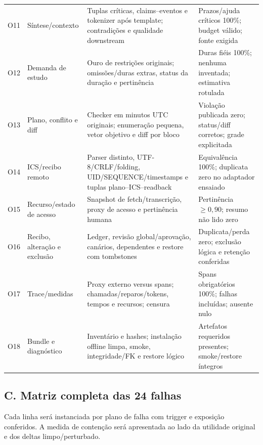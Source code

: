 \documentclass[12pt]{article}
\begin{document}
\begin{center}
\begin{longtable}{@{}L{0.8cm}L{3.0cm}L{6.3cm}L{4.7cm}@{}}
O11 & Síntese/contexto & Tuplas críticas, claims--eventos e tokenizer após template; contradições e qualidade downstream & Prazos/ajuda críticos 100\%; budget válido; fonte exigida \\
O12 & Demanda de estudo & Ouro de restrições originais; omissões/duras extras, status da duração e pertinência & Duras fiéis 100\%; nenhuma inventada; estimativa rotulada \\
O13 & Plano, conflito e diff & Checker em minutos UTC originais; enumeração pequena, vetor objetivo e diff por bloco & Violação publicada zero; status/diff corretos; grade explicitada \\
O14 & ICS/recibo remoto & Parser distinto, UTF-8/CRLF/folding, UID/SEQUENCE/timestamps e tuplas plano--ICS--readback & Equivalência 100\%; duplicata zero no adaptador ensaiado \\
O15 & Recurso/estado de acesso & Snapshot de fetch/transcrição, proxy de acesso e pertinência humana & Pertinência $\geq0{,}90$; resumo não lido zero \\
O16 & Recibo, alteração e exclusão & Ledger, revisão global/aprovação, canários, dependentes e restore com tombstones & Duplicata/perda zero; exclusão lógica e retenção conferidas \\
O17 & Trace/medidas & Proxy externo versus spans; chamadas/reparos/tokens, tempos e recursos; censura & Spans obrigatórios 100\%; falhas incluídas; ausente nulo \\
O18 & Bundle e diagnóstico & Inventário e hashes; instalação offline limpa, smoke, integridade/FK e restore lógico & Artefatos requeridos presentes; smoke/restore íntegros \\
\bottomrule
\end{longtable}
\end{center}

\subsection*{C. Matriz completa das 24 falhas}

Cada linha será instanciada por plano de falha com trigger e exposição conferidos. A medida de contenção será apresentada ao lado da utilidade original e dos deltas limpo/perturbado.
\end{document}

